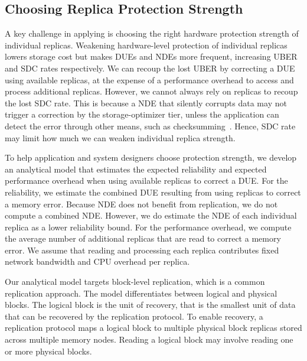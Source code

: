 \subsection{Choosing Replica Protection Strength}

A key challenge in applying \ramp is choosing the right hardware protection strength of individual replicas. 
Weakening hardware-level protection of individual replicas lowers storage cost but makes DUEs and NDEs more frequent, increasing UBER and SDC rates respectively.
We can recoup the lost UBER by correcting a DUE using available replicas, at the expense of a performance overhead to access and process additional replicas.
However, we cannot always rely on replicas to recoup the lost SDC rate. 
This is because a NDE that silently corrupts data may not trigger a correction by the storage-optimizer tier, unless the application can detect the error through other means, such as checksumming~\cite{zhang:pangolin:atc:2019}.
Hence, SDC rate may limit how much we can weaken individual replica strength.

To help application and system designers choose protection strength, we develop an analytical model that estimates the expected reliability and expected performance overhead when using available replicas to correct a DUE. 
For the reliability, we estimate the combined DUE resulting from using replicas to correct a memory error. 
Because NDE does not benefit from replication, we do not compute a combined NDE. 
However, we do estimate the NDE of each individual replica as a lower reliability bound. 
For the performance overhead, we compute the average number of additional replicas that are read to correct a memory error.
We assume that reading and processing each replica contributes fixed network bandwidth and CPU overhead per replica.

Our analytical model targets block-level replication, which is a common replication approach. The model differentiates between logical and physical blocks. The logical block is the unit of recovery, that is the smallest unit of data that can be recovered by the replication protocol. To enable recovery, a replication protocol maps a logical block to multiple physical block replicas stored across multiple memory nodes. Reading a logical block may involve reading one or more physical blocks.


